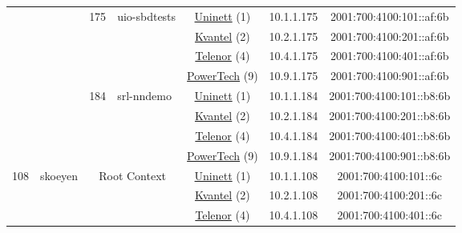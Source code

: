 \begin{small}
\begin{center}
\begin{longtable}{|c|c|c|c|c|c|c|c|}
  &  & \multirow{4}{*}{\tiny{175}} & \multicolumn{1}{|l|}{\multirow{4}{*}{\tiny{uio-sbdtests}}} & \multicolumn{2}{|c|}{\tiny{\href{https://www.uninett.no}{Uninett} (1)}} & \tiny{10.1.1.175} & \tiny{2001:700:4100:101::af:6b} \\* \cline{5-5}\cline{6-6}\cline{7-7}\cline{8-8}
  &  &  &  & \multicolumn{2}{|c|}{\tiny{\href{http://kvantel.no}{Kvantel} (2)}} & \tiny{10.2.1.175} & \tiny{2001:700:4100:201::af:6b} \\* \cline{5-5}\cline{6-6}\cline{7-7}\cline{8-8}
  &  &  &  & \multicolumn{2}{|c|}{\tiny{\href{https://www.telenor.no}{Telenor} (4)}} & \tiny{10.4.1.175} & \tiny{2001:700:4100:401::af:6b} \\* \cline{5-5}\cline{6-6}\cline{7-7}\cline{8-8}
  &  &  &  & \multicolumn{2}{|c|}{\tiny{\href{http://www.powertech.no}{PowerTech} (9)}} & \tiny{10.9.1.175} & \tiny{2001:700:4100:901::af:6b} \\* \cline{3-3}\cline{4-4}\cline{5-5}\cline{6-6}\cline{7-7}\cline{8-8}
  &  & \multirow{4}{*}{\tiny{184}} & \multicolumn{1}{|l|}{\multirow{4}{*}{\tiny{srl-nndemo}}} & \multicolumn{2}{|c|}{\tiny{\href{https://www.uninett.no}{Uninett} (1)}} & \tiny{10.1.1.184} & \tiny{2001:700:4100:101::b8:6b} \\* \cline{5-5}\cline{6-6}\cline{7-7}\cline{8-8}
  &  &  &  & \multicolumn{2}{|c|}{\tiny{\href{http://kvantel.no}{Kvantel} (2)}} & \tiny{10.2.1.184} & \tiny{2001:700:4100:201::b8:6b} \\* \cline{5-5}\cline{6-6}\cline{7-7}\cline{8-8}
  &  &  &  & \multicolumn{2}{|c|}{\tiny{\href{https://www.telenor.no}{Telenor} (4)}} & \tiny{10.4.1.184} & \tiny{2001:700:4100:401::b8:6b} \\* \cline{5-5}\cline{6-6}\cline{7-7}\cline{8-8}
  &  &  &  & \multicolumn{2}{|c|}{\tiny{\href{http://www.powertech.no}{PowerTech} (9)}} & \tiny{10.9.1.184} & \tiny{2001:700:4100:901::b8:6b} \\ \hline
 \multirow{20}{*}{\tiny{108}} & \multicolumn{1}{|l|}{\multirow{20}{*}{\tiny{skoeyen}}} & \multicolumn{2}{|c|}{\multirow{4}{*}{\tiny{Root Context}}} & \multicolumn{2}{|c|}{\tiny{\href{https://www.uninett.no}{Uninett} (1)}} & \tiny{10.1.1.108} & \tiny{2001:700:4100:101::6c} \\* \cline{5-5}\cline{6-6}\cline{7-7}\cline{8-8}
  &  & \multicolumn{2}{|c|}{} & \multicolumn{2}{|c|}{\tiny{\href{http://kvantel.no}{Kvantel} (2)}} & \tiny{10.2.1.108} & \tiny{2001:700:4100:201::6c} \\* \cline{5-5}\cline{6-6}\cline{7-7}\cline{8-8}
  &  & \multicolumn{2}{|c|}{} & \multicolumn{2}{|c|}{\tiny{\href{https://www.telenor.no}{Telenor} (4)}} & \tiny{10.4.1.108} & \tiny{2001:700:4100:401::6c} \\* \cline{5-5}\cline{6-6}\cline{7-7}\cline{8-8}

\end{longtable}
\end{center}
\end{small}
